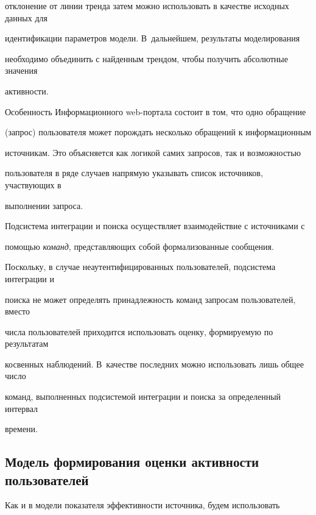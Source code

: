 отклонение от линии тренда затем можно использовать в качестве исходных данных для 


идентификации параметров модели. В~дальнейшем, результаты моделирования 


необходимо объединить с найденным трендом, чтобы получить абсолютные значения 


активности.


      


      Особенность Информационного web-портала состоит в том, что одно обращение 


(запрос) пользователя может порождать несколько обращений к информационным 


источникам. Это объясняется как логикой самих запросов, так и возможностью 


пользователя в ряде случаев напрямую указывать список источников, участвующих в 


выполнении запроса.


      


      Подсистема интеграции и поиска осуществляет взаимодействие с источниками с 


помощью \textit{команд}, представляющих собой формализованные сообщения. 


Поскольку, в случае неаутентифицированных пользователей, подсистема интеграции и 


поиска не может определять принадлежность команд запросам пользователей, вместо 


числа пользователей приходится использовать оценку, формируемую по результатам 


косвенных наблюдений. В~качестве последних можно использовать лишь общее число 


команд, выполненных подсистемой интеграции и поиска за определенный интервал 


времени.


      


\subsection{Модель формирования оценки активности пользователей} %


      


      Как и в модели показателя эффективности источника, будем использовать 


